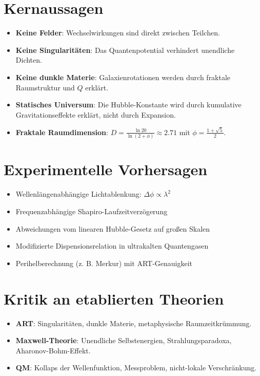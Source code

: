 \documentclass[11pt, a4paper]{article}
\begin{document}
\section*{Kernaussagen}
\begin{itemize}
    \item \textbf{Keine Felder}: Wechselwirkungen sind direkt zwischen Teilchen.
    \item \textbf{Keine Singularitäten}: Das Quantenpotential verhindert unendliche Dichten.
    \item \textbf{Keine dunkle Materie}: Galaxienrotationen werden durch fraktale Raumstruktur und \(Q\) erklärt.
    \item \textbf{Statisches Universum}: Die Hubble-Konstante wird durch kumulative Gravitationseffekte erklärt, nicht durch Expansion.
    \item \textbf{Fraktale Raumdimension}: \( D = \frac{\ln 20}{\ln(2 + \phi)} \approx 2.71 \) mit \(\phi = \frac{1+\sqrt{5}}{2}\).
\end{itemize}

\section*{Experimentelle Vorhersagen}
\begin{itemize}
    \item Wellenlängenabhängige Lichtablenkung: \(\Delta \phi \propto \lambda^2\)
    \item Frequenzabhängige Shapiro-Laufzeitverzögerung
    \item Abweichungen vom linearen Hubble-Gesetz auf großen Skalen
    \item Modifizierte Dispensionsrelation in ultrakalten Quantengasen
    \item Perihelberechnung (z. B. Merkur) mit ART-Genauigkeit
\end{itemize}

\section*{Kritik an etablierten Theorien}
\begin{itemize}
    \item \textbf{ART}: Singularitäten, dunkle Materie, metaphysische Raumzeitkrümmung.
    \item \textbf{Maxwell-Theorie}: Unendliche Selbstenergien, Strahlungsparadoxa, Aharonov-Bohm-Effekt.
    \item \textbf{QM}: Kollaps der Wellenfunktion, Messproblem, nicht-lokale Verschränkung.
\end{itemize}
\end{document}

